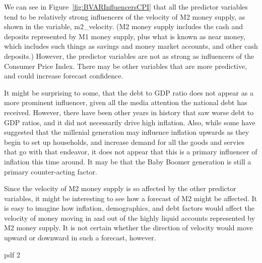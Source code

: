 \documentclass[12pt]{article}         %
\begin{document}
We can see in Figure~\ref{fig:BVARInfluencersCPI} that all the predictor variables tend to be relatively strong influencers of the velocity of M2 money supply, as shown in the variable, m2\_velocity.  (M2 money supply includes the cash and deposits represented by M1 money supply, plus what is known as near money, which includes such things as savings and money market accounts, and other cash deposits.)  However, the predictor variables are not as strong as influencers of the Consumer Price Index.  There may be other variables that are more predictive, and could increase forecast confidence.

It might be surprising to some, that the debt to GDP ratio does not appear as a more prominent influencer, given all the media attention the national debt has received.  However, there have been other years in history that saw worse debt to GDP ratios, and it did not necessarily drive high inflation.  Also, while some have suggested that the millenial generation may influence inflation upwards as they begin to set up households, and increase demand for all the goods and servies that go with that endeavor, it does not appear that this is a primary influencer of inflation this time around.  It may be that the Baby Boomer generation is still a primary counter-acting factor.

Since the velocity of M2 money supply is so affected by the other predictor variables, it might be interesting to see how a forecast of M2 might be affected.  It is easy to imagine how inflation, demographics, and debt factors would affect the velocity of money moving in and out of the highly liquid accounts represented by M2 money supply.  It is not certain whether the direction of velocity would move upward or downward in such a forecast, however. 

\begin{Schunk}
\begin{Soutput}
pdf 
  2 
\end{Soutput}
\end{Schunk}
\end{document}
